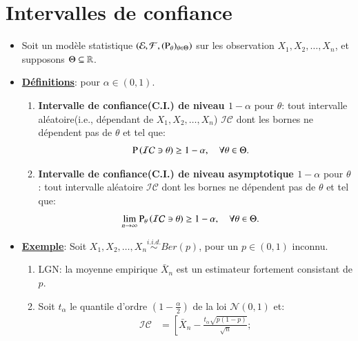 \section{Intervalles de confiance}
\frame{\sectionpage}
\begin{frame}
    [allowframebreaks]{\sectionpage}
    \begin{itemize}
        \item Soit un modèle statistique $\left(\mathcal{E}, \mathcal{F}, (\operatorname{P}_\theta)_{\theta\in\Theta}\right)$ 
        sur les observation $X_1, X_2, \ldots, X_n$, et supposons $\Theta\subseteq\mathbb{R}$.
        \item \textbf{\underline{Définitions}}: pour $\alpha\in(0, 1)$.
        \begin{enumerate}[-]
            \item \textbf{Intervalle de confiance(C.I.) de niveau $1-\alpha$} pour $\theta$: 
            tout intervalle aléatoire(i.e., dépendant de $X_1, X_2, \ldots, X_n$) $\mathcal{IC}$ 
            dont les bornes ne dépendent pas de $\theta$ et tel que: 
            \begin{align*}
                \operatorname{P}\left(\mathcal{IC}\ni\theta\right) &\geq 1-\alpha, \quad \forall \theta \in \Theta.
            \end{align*}
            \item \textbf{Intervalle de confiance(C.I.) de niveau asymptotique  $1-\alpha$} pour $\theta$: 
            tout intervalle aléatoire $\mathcal{IC}$ 
            dont les bornes ne dépendent pas de $\theta$ et tel que: 
            \begin{align*}
                \underset{n {\rightarrow} \infty}{\lim}\operatorname{P}_\theta\left(\mathcal{IC}\ni\theta\right) &\geq 1-\alpha, \quad \forall \theta \in \Theta.
            \end{align*}
        \end{enumerate}
        \framebreak
        \item \textbf{\underline{Exemple}}: Soit $X_1, X_2, \ldots, X_n \overset{i.i.d.}{\sim}Ber(p)$, 
        pour un $p\in (0, 1)$ inconnu.
        \begin{enumerate}[-]
            \item LGN:  la moyenne empirique $\bar{X}_n$ est un estimateur fortement consistant de $p$.
            \item Soit $t_\alpha$ le quantile d'ordre $(1-\frac{\alpha}{2})$ de la loi $\mathcal{N}(0, 1)$ et: 
            \begin{align*}
                \mathcal{IC}&=\left[\bar{X}_n - \frac{t_\alpha\sqrt{p(1-p)}}{\sqrt{n}}; 

\end{align*}
\end{enumerate}
\end{itemize}
\end{frame}

